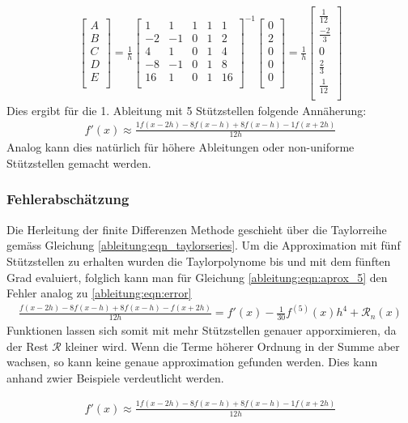 \begin{align}
\begin{bmatrix}
A \\
B \\
C \\
D \\
E \\
\end{bmatrix}
=
\frac{1}{h}
\begin{bmatrix}
1 & 1 & 1 & 1 & 1 \\
-2 & -1 & 0 & 1 & 2 \\
4 & 1 & 0 & 1 & 4 \\
-8 & -1 & 0 & 1 & 8 \\
16 & 1 & 0 & 1 & 16 \\
\end{bmatrix}^{-1}
\begin{bmatrix}
0 \\
2 \\
0 \\
0 \\
0 \\
\end{bmatrix}
=
\frac{1}{h}
\begin{bmatrix}
\frac{1}{12} \\
\frac{-2}{3} \\
0 \\
\frac{2}{3} \\
\frac{1}{12} \\
\end{bmatrix}
\end{align}
Dies ergibt für die 1. Ableitung mit 5 Stützstellen folgende Annäherung:
\begin{align}
f'(x)  \approx \frac{1f(x-2h) - 8f(x-h) + 8f(x-h) - 1f(x+2h)}{12h}
\label{ableitung:eqn:aprox_5}
\end{align}
Analog kann dies natürlich für höhere Ableitungen oder non-uniforme Stützstellen gemacht werden.
\subsubsection{Fehlerabschätzung}
Die Herleitung der finite Differenzen Methode geschieht über die Taylorreihe gemäss Gleichung \ref{ableitung:eqn_taylorseries}. Um die Approximation mit fünf Stützstellen zu erhalten wurden die Taylorpolynome bis und mit dem fünften Grad evaluiert, folglich kann man für Gleichung \ref{ableitung:eqn:aprox_5} den Fehler analog zu \ref{ableitung:eqn:error}
\begin{align}
\frac{f(x-2h) - 8f(x-h) + 8f(x-h) - f(x+2h)}{12h} = f'(x) - \frac{1}{30} f^{(5)} (x)h^{4}+\mathcal{R}_n(x)
\label{ableitung:eqn:error}
\end{align}
Funktionen lassen sich somit mit mehr Stützstellen genauer apporximieren, da der Rest $\mathcal{R}$ kleiner wird. Wenn die Terme höherer Ordnung in der Summe aber wachsen, so kann keine genaue approximation gefunden werden. Dies kann anhand zwier Beispiele verdeutlicht werden.

\begin{align}
f'(x)  \approx \frac{1f(x-2h) - 8f(x-h) + 8f(x-h) - 1f(x+2h)}{12h}
\label{ableitung:eqn:aprox_5}
\end{align}



